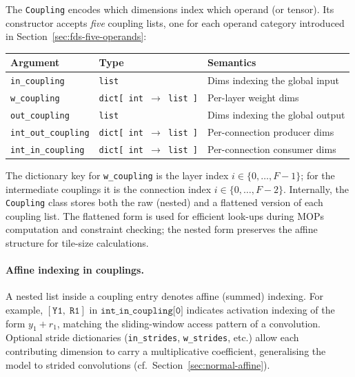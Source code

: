 \noindent
The \texttt{Coupling} encodes which dimensions index which operand (or tensor).
Its constructor accepts \emph{five} coupling lists, one for each
operand category introduced in Section~\ref{sec:fds-five-operands}:

\begin{center}
\small
\begin{tabular}{lll}
  \toprule
  \textbf{Argument} & \textbf{Type} & \textbf{Semantics} \\
  \midrule
  \texttt{in\_coupling}
      & \texttt{list}
      & Dims indexing the global input \\
  \texttt{w\_coupling}
      & \texttt{dict[\,int $\to$ list\,]}
      & Per-layer weight dims \\
  \texttt{out\_coupling}
      & \texttt{list}
      & Dims indexing the global output \\
  \texttt{int\_out\_coupling}
      & \texttt{dict[\,int $\to$ list\,]}
      & Per-connection producer dims \\
  \texttt{int\_in\_coupling}
      & \texttt{dict[\,int $\to$ list\,]}
      & Per-connection consumer dims \\
  \bottomrule
\end{tabular}
\end{center}

\noindent
The dictionary key for \texttt{w\_coupling} is the layer index
$i \in \{0, \dots, F\!-\!1\}$; for the intermediate couplings it is
the connection index $i \in \{0, \dots, F\!-\!2\}$.
Internally, the \texttt{Coupling} class stores both the raw (nested)
and a flattened version of each coupling list.
The flattened form is used for efficient look-ups during MOPs
computation and constraint checking; the nested form preserves the
affine structure for tile-size calculations.

\paragraph{Affine indexing in couplings.}
A nested list inside a coupling entry denotes affine (summed) indexing.
For example, $[\texttt{Y1},\; \texttt{R1}]$ in
$\texttt{int\_in\_coupling[0]}$ indicates activation indexing of the
form $y_1 + r_1$, matching the sliding-window access pattern of a
convolution.
Optional stride dictionaries (\texttt{in\_strides},
\texttt{w\_strides}, etc.) allow each contributing dimension to carry a
multiplicative coefficient, generalising the model to strided
convolutions (cf.\ Section~\ref{sec:normal-affine}).

